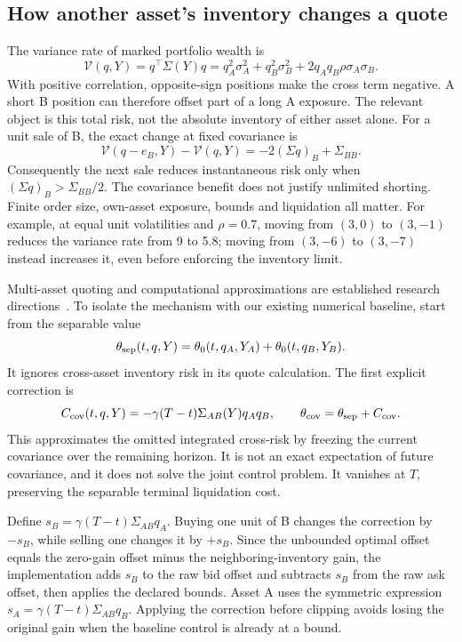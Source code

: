 \subsection{How another asset's inventory changes a quote}
The variance rate of marked portfolio wealth is
\[
 \mathcal V(q,Y)=q^\top\Sigma(Y)q
 =q_A^2\sigma_A^2+q_B^2\sigma_B^2
 +2q_Aq_B\rho\sigma_A\sigma_B.
\]
With positive correlation, opposite-sign positions make the cross term negative. A short B position can therefore offset part of a long A exposure. The relevant object is this total risk, not the absolute inventory of either asset alone. For a unit sale of B, the exact change at fixed covariance is
\[
 \mathcal V(q-e_B,Y)-\mathcal V(q,Y)
 =-2(\Sigma q)_B+\Sigma_{BB}.
\]
Consequently the next sale reduces instantaneous risk only when $(\Sigma q)_B>\Sigma_{BB}/2$. The covariance benefit does not justify unlimited shorting. Finite order size, own-asset exposure, bounds and liquidation all matter. For example, at equal unit volatilities and $\rho=0.7$, moving from $(3,0)$ to $(3,-1)$ reduces the variance rate from 9 to 5.8; moving from $(3,-6)$ to $(3,-7)$ instead increases it, even before enforcing the inventory limit.

Multi-asset quoting and computational approximations are established research directions~\cite{BergaultEvangelistaGueantVieira2022,multifactor}. To isolate the mechanism with our existing numerical baseline, start from the separable value
\[
 \theta_{\rm sep}(t,q,Y)
 =\theta_0(t,q_A,Y_A)+\theta_0(t,q_B,Y_B).
\]
It ignores cross-asset inventory risk in its quote calculation. The first explicit correction is
\[
 C_{\rm cov}(t,q,Y)=-\gamma(T-t)\Sigma_{AB}(Y)q_Aq_B,
 \qquad \theta_{\rm cov}=\theta_{\rm sep}+C_{\rm cov}.
\]
This approximates the omitted integrated cross-risk by freezing the current covariance over the remaining horizon. It is not an exact expectation of future covariance, and it does not solve the joint control problem. It vanishes at $T$, preserving the separable terminal liquidation cost.

Define $s_B=\gamma(T-t)\Sigma_{AB}q_A$. Buying one unit of B changes the correction by $-s_B$, while selling one changes it by $+s_B$. Since the unbounded optimal offset equals the zero-gain offset minus the neighboring-inventory gain, the implementation adds $s_B$ to the raw bid offset and subtracts $s_B$ from the raw ask offset, then applies the declared bounds. Asset A uses the symmetric expression $s_A=\gamma(T-t)\Sigma_{AB}q_B$. Applying the correction before clipping avoids losing the original gain when the baseline control is already at a bound.

